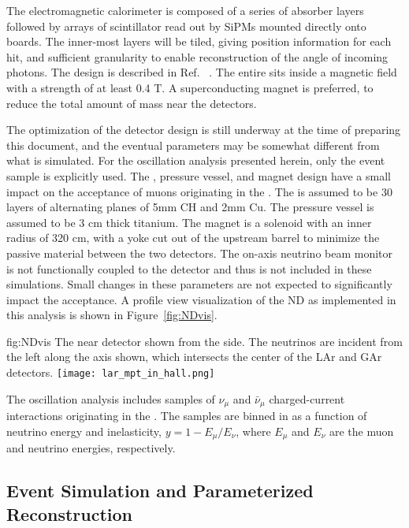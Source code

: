 The electromagnetic calorimeter is composed of a series of absorber layers followed by arrays of scintillator read out by SiPMs mounted directly onto boards. The inner-most layers will be tiled, giving \threed position information for each hit, and sufficient granularity to enable reconstruction of the angle of incoming photons. The  design is described in Ref. ~\cite{Emberger:2018pgr}. The entire  sits inside a magnetic field with a strength of at least 0.4 T. A superconducting magnet is preferred, to reduce the total amount of mass near the detectors.

The optimization of the detector design is still underway at the time of preparing this document, and the eventual parameters may be somewhat different from what is simulated. For the oscillation analysis presented herein, only the  event sample is explicitly used. The , pressure vessel, and magnet design have a small impact on the acceptance of muons originating in the . The  is assumed to be 30 layers of alternating planes of 5mm CH and 2mm Cu. The pressure vessel is assumed to be 3 cm thick titanium. The magnet is a solenoid with an inner radius of 320 cm, with a yoke cut out of the upstream barrel to minimize the passive material between the two  detectors. 
%
The on-axis neutrino beam monitor 
%
is not functionally coupled to the  detector and thus is not included in these simulations. Small changes in these parameters are not expected to significantly impact the acceptance. A profile view visualization of the ND as implemented in this analysis is shown in Figure~\ref{fig:NDvis}.


\begin{dunefigure}[ND visualization]{fig:NDvis}
{The near detector shown from the side. The neutrinos are incident from the left along the axis shown, which intersects the center of the LAr and GAr detectors.}
 \texttt{[image: lar\_mpt\_in\_hall.png]}
\end{dunefigure}

The oscillation analysis includes samples of $\nu_{\mu}$ and $\bar{\nu}_{\mu}$ charged-current interactions originating in the . The samples are binned in \twod as a function of neutrino energy and inelasticity, $y = 1 - E_{\mu}/E_{\nu}$, where $E_{\mu}$ and $E_{\nu}$ are the muon and neutrino energies, respectively. 

\subsection{Event Simulation and Parameterized Reconstruction}
\label{sec:ndsimreco}


